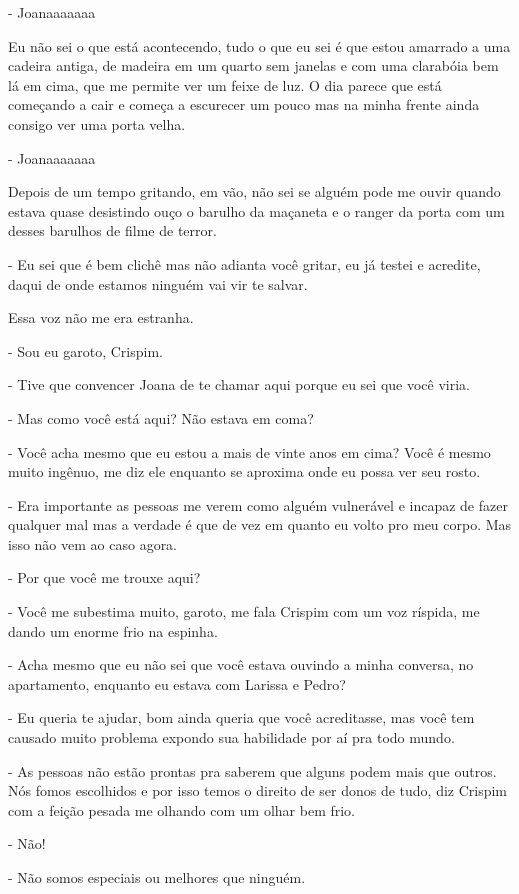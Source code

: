 - Joanaaaaaaa

Eu não sei o que está acontecendo, tudo o que eu sei é que estou amarrado a uma cadeira antiga, de madeira em um quarto sem janelas e com uma clarabóia bem lá em cima, que me permite ver um feixe de luz. O dia parece que está começando a cair e começa a escurecer um pouco mas na minha frente ainda consigo ver uma porta velha.

- Joanaaaaaaa

Depois de um tempo gritando, em vão, não sei se alguém pode me ouvir quando estava quase desistindo ouço o barulho da maçaneta e o ranger da porta com um desses barulhos de filme de terror.

- Eu sei que é bem clichê mas não adianta você gritar, eu já testei e acredite, daqui de onde estamos ninguém vai vir te salvar.

Essa voz não me era estranha.

- Sou eu garoto, Crispim.

- Tive que convencer Joana de te chamar aqui porque eu sei que você viria.

- Mas como você está aqui? Não estava em coma?

- Você acha mesmo que eu estou a mais de vinte anos em cima? Você é mesmo muito ingênuo, me diz ele enquanto se aproxima onde eu possa ver seu rosto.

- Era importante as pessoas me verem como alguém vulnerável e incapaz de fazer qualquer mal mas a verdade é que de vez em quanto eu volto pro meu corpo. Mas isso não vem ao caso agora.

- Por que você me trouxe aqui?

- Você me subestima muito, garoto, me fala Crispim com um voz ríspida, me dando um enorme frio na espinha.

- Acha mesmo que eu não sei que você estava ouvindo a minha conversa, no apartamento, enquanto eu estava com Larissa e Pedro?

- Eu queria te ajudar, bom ainda queria que você acreditasse, mas você tem causado muito problema expondo sua habilidade por aí pra todo mundo.

- As pessoas não estão prontas pra saberem que alguns podem mais que outros. Nós fomos escolhidos e por isso temos o direito de ser donos de tudo, diz Crispim com a feição pesada me olhando com um olhar bem frio.

- Não!

- Não somos especiais ou melhores que ninguém.

